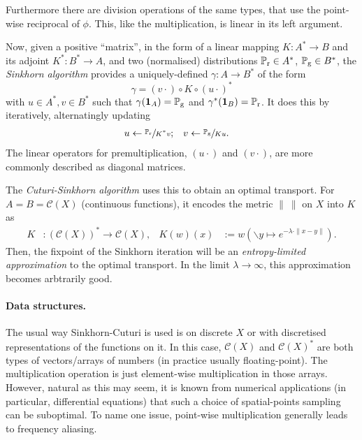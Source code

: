 \documentclass[a4paper]{easychair}
\begin{document}
Furthermore there are division operations of the same types, that use the point-wise reciprocal of $\phi$. This, like the multiplication, is linear in its left argument.

Now, given a positive “matrix”, in the form of a linear mapping $K: A^\ast\to B$ and its adjoint $K^\ast: B^\ast\to A$, and two (normalised) distributions $\mathbb{P}_\mathrm{r}\in A^\ast$, $\mathbb{P}_\mathrm{g}\in B^\ast$, the \emph{Sinkhorn algorithm} \cite{SinkhornDiagEquivlc} provides a uniquely-defined $\gamma: A\to B^\ast$ of the form
\[
  \gamma = (v\cdot) \circ K \circ (u\cdot)^\ast
\]
with $u\in A^\ast, v\in B^\ast$ such that $\gamma(\mathbf{1}_A)=\mathbb{P}_\mathrm{g}$ and $\gamma^\ast(\mathbf{1}_B)=\mathbb{P}_\mathrm{r}$. It does this by iteratively, alternatingly updating
\[\begin{aligned}
  u &\leftarrow \sfrac{\mathbb{P}_\mathrm{r}}{K^\ast v};
   & v &\leftarrow \sfrac{\mathbb{P}_\mathrm{g}}{K u}.
\end{aligned}\]
The linear operators for premultiplication, $(u\cdot)$ and $(v\cdot)$, are more commonly described as diagonal matrices.

The \emph{Cuturi-Sinkhorn algorithm} \cite{CuturiSinkhornLightspeed} uses this to obtain an optimal transport. For $A=B=\mathcal{C}(X)$ (continuous functions), it encodes the metric $\|\ \|$ on $X$ into $K$ as
\[\begin{aligned}
  K&:(\mathcal{C}(X))^\ast \to \mathcal{C}(X), & K(w)(x) &:= w(\backslash y \mapsto e^{-\lambda\cdot\|x-y\|}).
\end{aligned}\]
Then, the fixpoint of the Sinkhorn iteration will be an \emph{entropy-limited approximation} to the optimal transport. In the limit $\lambda\to\infty$, this approximation becomes arbtrarily good.


\paragraph{Data structures.}
The usual way Sinkhorn-Cuturi is used is on discrete $X$ or with discretised representations of the functions on it. In this case, $\mathcal{C}(X)$ and $\mathcal{C}(X)^\ast$ are both types of vectors/arrays of numbers (in practice usually floating-point). The multiplication operation is just element-wise multiplication in those arrays.
However, natural as this may seem, it is known from numerical applications (in particular, differential equations) that such a choice of spatial-points sampling can be suboptimal. To name one issue, point-wise multiplication generally leads to frequency aliasing.
\end{document}
